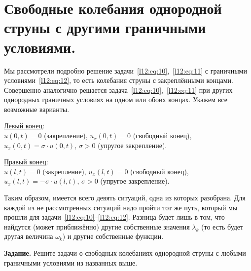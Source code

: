 \section[Свободные колебания однородной струны с другими г. у.]{Свободные колебания однородной струны с другими граничными условиями.}
\label{lecture11section4}
Мы рассмотрели подробно решение задачи~\eqref{l12:eq:10},~\eqref{l12:eq:11} с граничными условиями~\eqref{l12:eq:12}, то есть колебания струны с закреплёнными концами. Совершенно аналогично решается задача~\eqref{l12:eq:10},~\eqref{l12:eq:11} при других однородных граничных условиях на одном или обоих концах. Укажем все возможные варианты.
\vspace{0,4cm}

\noindent\underline{Левый конец}:\\[4pt]
$u(0,t)=0$ (закрепление), $u_x(0,t)=0$ (свободный конец), $u_x(0,t)=\sigma\cdot u(0,t)$, $\sigma>0$ (упругое закрепление).
\vspace{0,2cm}

\noindent\underline{Правый конец}:\\[4pt]  
$u(l,t)=0$ (закрепление), $u_x(l,t)=0$ (свободный конец), $u_x(l,t)=-\sigma\cdot u(l,t)$, $\sigma>0$ (упругое закрепление).
\vspace{0,4cm}

Таким образом, имеется всего девять ситуаций, одна из которых разобрана. Для каждой из не рассмотренных ситуаций надо пройти тот же путь, который мы прошли для задачи~\eqref{l12:eq:10}--\eqref{l12:eq:12}. Разница будет лишь в том, что найдутся (может приближённо) другие собственные значения $\lambda_k$  (то есть будет другая величина $\omega_k$) и другие собственные функции.
\vspace{0,2cm}

\noindent\textbf{Задание. }Решите задачи о свободных колебаниях однородной струны с любыми граничными условиями из названных выше.